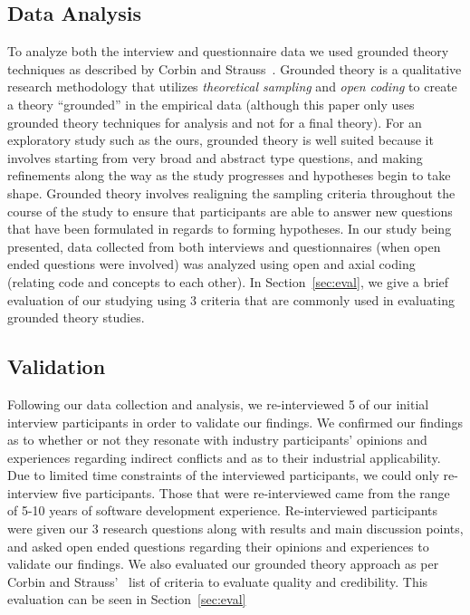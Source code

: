 \documentclass[conference]{IEEEtran}
\begin{document}
\subsection{Data Analysis}
To analyze both the interview and questionnaire data we used grounded theory techniques as described by Corbin and Strauss~\cite{Corbin:1998:SP}.
Grounded theory is a qualitative research methodology that utilizes \textit{theoretical sampling} and
\textit{open coding} to create a theory ``grounded'' in the empirical data (although this paper only uses grounded
theory techniques for analysis and not for a final theory). For an exploratory study such as
the ours, grounded theory is well suited because it involves starting from very broad and abstract type questions, and
making refinements along the way as the study progresses and hypotheses begin to take shape. Grounded theory involves
realigning the sampling criteria throughout the course of the study to ensure that participants are able to answer new
questions that have been formulated in regards to forming hypotheses. In our study being presented, data collected from
both interviews and questionnaires (when open ended questions were involved) was analyzed using open and axial coding (relating
code and concepts to each other).
In Section~\ref{sec:eval}, we give a brief evaluation of our studying using
3 criteria that are commonly used in evaluating grounded theory studies.

\subsection{Validation}

Following our data collection and analysis, we re-interviewed 5 of our initial interview participants
in order to validate our findings. We confirmed our findings as to whether or not they resonate with
industry participants' opinions and experiences regarding indirect conflicts and as to their industrial
applicability. Due to limited time constraints of the interviewed participants, we could only re-interview
five participants. Those that were re-interviewed came from the range of 5-10 years of software development
experience. Re-interviewed participants were given our 3 research questions along with results and main
discussion points, and asked open ended questions regarding their opinions and experiences to validate our
findings. We also evaluated our grounded theory approach as per Corbin and Strauss'~\cite{Corbin:1998:SP}
list of criteria to evaluate quality and credibility. This evaluation can be seen in Section~\ref{sec:eval}
\end{document}
